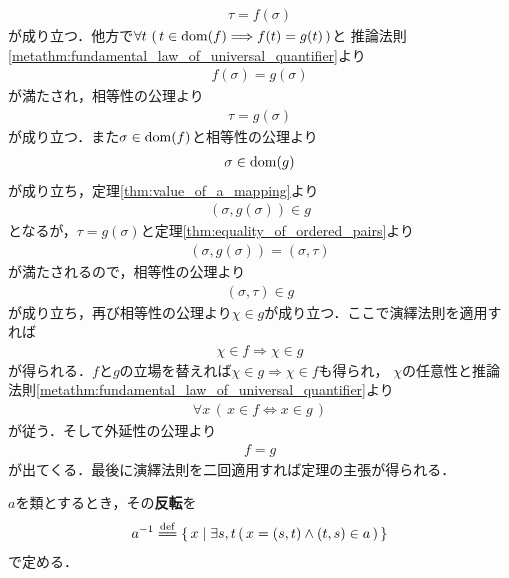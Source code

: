 \begin{prf}
		\begin{align}
			\tau = f(\sigma)
		\end{align}
		が成り立つ．他方で$\forall t\, \left(\, t \in \operatorname*{dom} (f) \Longrightarrow f(t) = g(t)\, \right)$と
		推論法則\ref{metathm:fundamental_law_of_universal_quantifier}より
		\begin{align}
			f(\sigma) = g(\sigma)
		\end{align}
		が満たされ，相等性の公理より
		\begin{align}
			\tau = g(\sigma)
		\end{align}
		が成り立つ．また$\sigma \in \operatorname*{dom} (f)$と相等性の公理より
		\begin{align}
			\sigma \in \operatorname*{dom} (g)
		\end{align}
		が成り立ち，定理\ref{thm:value_of_a_mapping}より
		\begin{align}
			(\sigma,g(\sigma)) \in g
		\end{align}
		となるが，$\tau = g(\sigma)$と定理\ref{thm:equality_of_ordered_pairs}より
		\begin{align}
			(\sigma,g(\sigma)) = (\sigma,\tau)
		\end{align}
		が満たされるので，相等性の公理より
		\begin{align}
			(\sigma,\tau) \in g
		\end{align}
		が成り立ち，再び相等性の公理より$\chi \in g$が成り立つ．ここで演繹法則を適用すれば
		\begin{align}
			\chi \in f \Longrightarrow \chi \in g
		\end{align}
		が得られる．$f$と$g$の立場を替えれば$\chi \in g \Longrightarrow \chi \in f$も得られ，
		$\chi$の任意性と推論法則\ref{metathm:fundamental_law_of_universal_quantifier}より
		\begin{align}
			\forall x\, (\, x \in f \Longleftrightarrow x \in g\, )
		\end{align}
		が従う．そして外延性の公理より
		\begin{align}
			f = g
		\end{align}
		が出てくる．最後に演繹法則を二回適用すれば定理の主張が得られる．
		\QED
	\end{prf}
	
	\begin{screen}
		\begin{dfn}[反転]
			$a$を類とするとき，その{\bf 反転}を
			\begin{align}
				\inv{a} \defeq  \Set{x}{\exists s,t\, (\, x=(s,t) \wedge (t,s) \in a\, )}
			\end{align}
			で定める．
		\end{dfn}
	\end{screen}
	
